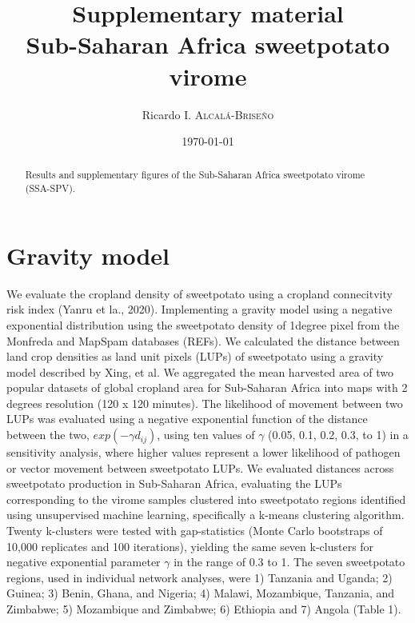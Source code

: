 \documentclass{article}
\title{Supplementary material \\  Sub-Saharan Africa sweetpotato virome } %
\author{Ricardo I. \textsc{Alcal\'a-Brise\~no}} %
\date{\today} %
\begin{document}
\maketitle %

 \begin{abstract}
 Results and supplementary figures of the Sub-Saharan Africa  sweetpotato virome (SSA-SPV).  
 \end{abstract}


\section{Gravity model}
We evaluate the cropland density of sweetpotato using a cropland connecitvity risk index (Yanru et la., 2020). Implementing a gravity model using a negative exponential distribution using the sweetpotato density of 1degree pixel from the Monfreda and MapSpam databases (REFs). 
We calculated the distance between land crop densities as land unit pixels (LUPs) of sweetpotato using a gravity model described by Xing, et al. We aggregated the mean harvested area of two popular datasets of global cropland area for Sub-Saharan Africa into maps with 2 degrees resolution (120 x 120 minutes). The likelihood of movement between two LUPs was evaluated using a negative exponential function of the distance between the two, $exp(-\gamma d_{ij})$, using ten values of $\gamma$ (0.05, 0.1, 0.2, 0.3, to 1) in a sensitivity analysis, where higher values represent a lower likelihood of pathogen or vector movement between sweetpotato LUPs. We evaluated distances across sweetpotato production in Sub-Saharan Africa, evaluating the LUPs corresponding to the virome samples clustered into sweetpotato regions identified using unsupervised machine learning, specifically a k-means clustering algorithm. Twenty k-clusters were tested with gap-statistics (Monte Carlo bootstraps of 10,000 replicates and 100 iterations), yielding the same seven k-clusters for negative exponential parameter $\gamma$ in the range of 0.3 to 1.  The seven sweetpotato regions, used in individual network analyses, were 1) Tanzania and Uganda; 2) Guinea; 3) Benin, Ghana, and Nigeria; 4) Malawi, Mozambique, Tanzania, and Zimbabwe; 5) Mozambique and Zimbabwe; 6) Ethiopia and 7) Angola (Table 1).
\end{document}
